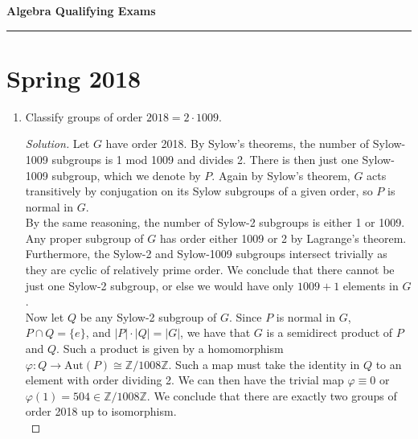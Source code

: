 \documentclass[11pt,letterpaper]{report}
\newcommand{\integers}{\mathbb{Z}}
\newcommand{\Aut}{\text{Aut}}
\newenvironment{solution}
{\begin{proof}[Solution]}
{\end{proof}}
\begin{document}
\begin{center}
{\bf \Large Algebra Qualifying Exams} %
\vspace{0.2cm}
\hrule
\end{center}

\section{Spring 2018}
\begin{enumerate}
	\item Classify groups of order $2018 = 2\cdot 1009$.
	\begin{solution}
		Let $G$ have order 2018. By Sylow's theorems, the number of Sylow-1009 subgroups is 1 mod 1009 and divides 2. There is then just one Sylow-1009 subgroup, which we denote by $P$. Again by Sylow's theorem, $G$ acts transitively by conjugation on its Sylow subgroups of a given order, so $P$ is normal in $G$.\\

		\noindent By the same reasoning, the number of Sylow-2 subgroups is either 1 or 1009. Any proper subgroup of $G$ has order either 1009 or 2 by Lagrange's theorem. Furthermore, the Sylow-2 and Sylow-1009 subgroups intersect trivially as they are cyclic of relatively prime order. We conclude that there cannot be just one Sylow-2 subgroup, or else we would have only $1009+1$ elements in $G$.\\

		\noindent Now let $Q$ be any Sylow-2 subgroup of $G$. Since $P$ is normal in $G$, $P\cap Q = \{e\}$, and $|P|\cdot |Q| = |G|$, we have that $G$ is a semidirect product of $P$ and $Q$. Such a product is given by a homomorphism $\varphi: Q\to \Aut(P) \cong \integers/1008\integers$. Such a map must take the identity in $Q$ to an element with order dividing 2. We can then have the trivial map $\varphi \equiv 0$ or $\varphi(1) = 504\in \integers/1008\integers$. We conclude that there are exactly two groups of order 2018 up to isomorphism.\\


\end{solution}
\end{enumerate}
\end{document}
